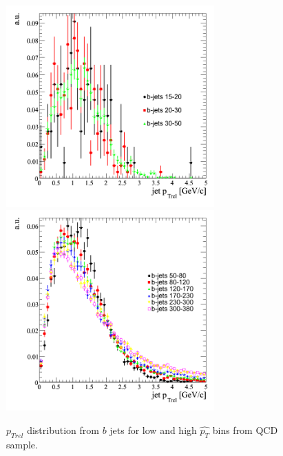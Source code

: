 \begin{figure}[htbp]
  \begin{center}
    \includegraphics[width=80mm]{Figures/jet_ptrel_qcdbinned.png}
    \includegraphics[width=80mm]{Figures/jet_ptrel2qcdbinned.png}
  \end{center}
  \caption{$p_{Trel}$ distribution from $b$ jets for low and high $\hat{p_T}$ bins from QCD sample.}
  \label{fig:jet_ptrel_b}
\end{figure}

